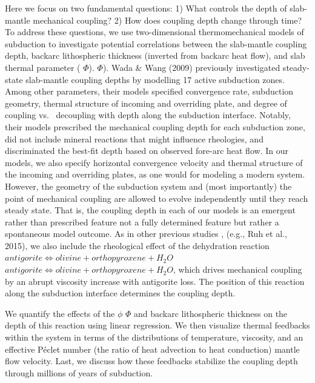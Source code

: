 \documentclass[draft,linenumbers]{agujournal2018} %
\providecommand{\DIFaddtex}[1]{{\protect\color{blue} \sf #1}} %
\providecommand{\DIFdeltex}[1]{{\protect\color{red} \scriptsize #1}} %
\providecommand{\DIFaddbegin}{} %
\providecommand{\DIFaddend}{} %
\providecommand{\DIFdelbegin}{} %
\providecommand{\DIFdelend}{} %
\providecommand{\DIFadd}[1]{\texorpdfstring{\DIFaddtex{#1}}{#1}} %
\providecommand{\DIFdel}[1]{\texorpdfstring{\DIFdeltex{#1}}{}} %
\newcommand{\DIFscaledelfig}{0.3}
\newlength{\DIFdelgraphicswidth} %
\newlength{\DIFdelgraphicsheight} %
\newcommand{\DIFaddincludegraphics}[2][]{{\color{blue}\fbox{\DIFOincludegraphics[#1]{#2}}}} %
\newcommand{\DIFdelincludegraphics}[2][]{%
\sbox{\DIFdelgraphicsbox}{\DIFOincludegraphics[#1]{#2}}%
\settoboxwidth{\DIFdelgraphicswidth}{\DIFdelgraphicsbox} %
\settoboxtotalheight{\DIFdelgraphicsheight}{\DIFdelgraphicsbox} %
\scalebox{\DIFscaledelfig}{%
\parbox[b]{\DIFdelgraphicswidth}{\usebox{\DIFdelgraphicsbox}\\[-\baselineskip] \rule{\DIFdelgraphicswidth}{0em}}\llap{\resizebox{\DIFdelgraphicswidth}{\DIFdelgraphicsheight}{%
\setlength{\unitlength}{\DIFdelgraphicswidth}%
\begin{picture}(1,1)%
\thicklines\linethickness{2pt} %
{\color[rgb]{1,0,0}\put(0,0){\framebox(1,1){}}}%
{\color[rgb]{1,0,0}\put(0,0){\line( 1,1){1}}}%
{\color[rgb]{1,0,0}\put(0,1){\line(1,-1){1}}}%
\end{picture}%
}\hspace*{3pt}}} %
} %
\DeclareRobustCommand{\DIFaddbegin}{\DIFOaddbegin \let\includegraphics\DIFaddincludegraphics} %
\DeclareRobustCommand{\DIFaddend}{\DIFOaddend \let\includegraphics\DIFOincludegraphics} %
\DeclareRobustCommand{\DIFdelbegin}{\DIFOdelbegin \let\includegraphics\DIFdelincludegraphics} %
\DeclareRobustCommand{\DIFdelend}{\DIFOaddend \let\includegraphics\DIFOincludegraphics} %
\begin{document}
Here we focus on two fundamental questions: 1) What controls the depth
of slab-mantle mechanical coupling? 2) How does coupling depth change
through time? To address these questions, we use two-dimensional
thermomechanical models of subduction to investigate potential
correlations between the slab-mantle coupling depth, backarc
lithospheric thickness (inverted from backarc heat flow), and slab
thermal parameter (\DIFdelbegin \DIFdel{$\Phi$). }%
\DIFdelend \DIFaddbegin \DIFadd{\(\Phi\)). Wada \& Wang (2009) }\DIFaddend previously
investigated steady-state slab-mantle coupling depths by modelling 17
active subduction zones. Among other parameters, their models specified
convergence rate, subduction geometry, thermal structure of incoming and
overriding plate, and degree of coupling vs.\DIFaddbegin \DIFadd{~}\DIFaddend decoupling with depth along
the subduction interface. Notably, their models prescribed the
mechanical coupling depth for each subduction zone, did not include
mineral reactions that might influence rheologies, and discriminated the
best-fit depth based on observed fore-arc heat flow. In our models, we
also specify horizontal convergence velocity and thermal structure of
the incoming and overriding plates, as one would for modeling a modern
system. However, the geometry of the subduction system and (most
importantly) the point of mechanical coupling are allowed to evolve
independently until they reach steady state. That is, the coupling depth
in each of our models is \DIFdelbegin \DIFdel{an emergent rather than prescribed feature }\DIFdelend \DIFaddbegin \DIFadd{not a fully determined feature but rather a
spontaneous model outcome}\DIFaddend . As in other previous studies \DIFdelbegin %
\DIFdel{, }\DIFdelend \DIFaddbegin \DIFadd{(e.g., Ruh et
al., 2015), }\DIFaddend we also include the rheological effect of the dehydration
reaction
\DIFdelbegin \DIFdel{$antigorite \allowbreak\Leftrightarrow olivine + orthopyroxene + H_{2}O$}\DIFdelend \DIFaddbegin \DIFadd{\(antigorite \allowbreak \Leftrightarrow olivine + orthopyroxene + H_{2}O\)}\DIFaddend ,
which drives mechanical coupling by an abrupt viscosity increase with
antigorite loss. The position of this reaction along the subduction
interface determines the coupling depth.

We quantify the effects of \DIFdelbegin \DIFdel{the $\phi$ }\DIFdelend \DIFaddbegin \DIFadd{\(\Phi\) }\DIFaddend and backarc lithospheric thickness
on the depth of this reaction using linear regression. We then visualize
thermal feedbacks within the system in terms of the distributions of
temperature, viscosity, and \DIFdelbegin \DIFdel{an effective P\'{e}clet number (the ratio of heat advection to heat conduction)}\DIFdelend \DIFaddbegin \DIFadd{mantle flow velocity}\DIFaddend . Last, we discuss how
\DIFdelbegin \DIFdel{these }\DIFdelend feedbacks stabilize the coupling depth through millions of years of
subduction.
\end{document}

